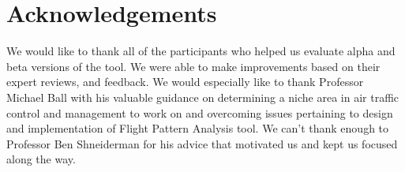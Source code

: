 \documentclass{sig-alternate}
\begin{document}
\section{Acknowledgements}
\label{sec-acknowledgements}
We would like to thank all of the
participants who helped us evaluate alpha and
beta versions of the tool. We were able to make
improvements based on their expert reviews,
and feedback. We would especially like to thank
Professor Michael Ball with his valuable guidance
on determining a niche area in air traffic control
and management to work on and overcoming issues
pertaining to design and implementation of Flight
Pattern Analysis tool. We can’t thank enough to
Professor Ben Shneiderman for his advice that
motivated us and kept us focused along the way.


\begin{small}

\end{small}
\end{document}
